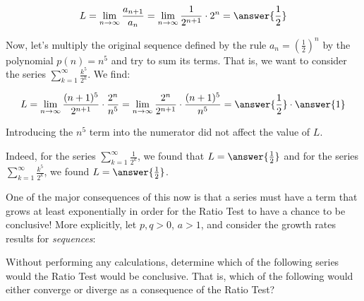 \documentclass{ximera}
\begin{document}
\begin{exercise}
\begin{exercise}
\begin{exercise}
\[
L = \lim_{n \to \infty} \frac{a_{n+1}}{a_n} = \lim_{n \to \infty} \frac{1}{2^{n+1}}\cdot 2^n = \answer{\frac{1}{2}}
\]

Now, let's multiply the original sequence defined by the rule $a_n = \left(\frac{1}{2}\right)^n$ by the polynomial $p(n) = n^5$ and try to sum its terms.  That is, we want to consider the series $\sum_{k=1}^{\infty} \frac{k^5}{2^k}$. We find:

\[
L =  \lim_{n \to \infty} \frac{(n+1)^5}{2^{n+1}} \cdot \frac{2^n}{n^5} =  \lim_{n \to \infty} \frac{2^n}{2^{n+1}} \cdot \frac{(n+1)^5}{n^5} =  \answer{\frac{1}{2}} \cdot \answer{1}
\]

Introducing the $n^5$ term into the numerator did not affect the value of $L$.

Indeed, for the series $\sum_{k=1}^{\infty} \frac{1}{2^k}$, we found that $L=\answer{\frac{1}{2}}$ and for the series $\sum_{k=1}^{\infty} \frac{k^5}{2^k}$, we found $L=\answer{\frac{1}{2}}$. 

\begin{exercise}
One of the major consequences of this now is that a series must have a term that grows at least exponentially in order for the Ratio Test to have a chance to be conclusive!  More explicitly, let $p, q > 0$, $a>1$, and consider the growth rates results for \emph{sequences}:

\begin{image}
  \end{image}

Without performing any calculations, determine which of the following series would the Ratio Test would be conclusive.  That is, which of the following would either converge or diverge as a consequence of the Ratio Test?
\begin{selectAll}
\end{selectAll}

\end{exercise}
\end{exercise}
\end{exercise}
\end{exercise}
\end{document}
